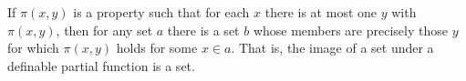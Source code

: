 If $\pi(x,y)$ is a property such that for each $x$ there is at most one $y$ with $\pi(x,y)$, then for any set $a$ there is a set $b$ whose members are precisely those $y$ for which $\pi(x,y)$ holds for some $x \in a$. That is, the image of a set under a definable partial function is a set.
